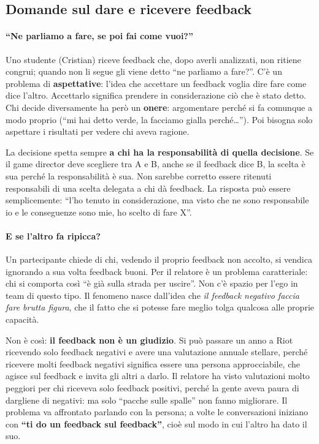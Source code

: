 \subsection{Domande sul dare e ricevere feedback}

\paragraph{``Ne parliamo a fare, se poi fai come vuoi?''} Uno studente (Cristian)
riceve feedback che, dopo averli analizzati, non ritiene congrui; quando non
li segue gli viene detto ``ne parliamo a fare?''. C'è un problema di
\textbf{aspettative}: l'idea che accettare un feedback voglia dire fare come
dice l'altro. Accettarlo significa prendere in considerazione ciò che è stato
detto. Chi decide diversamente ha però un \textbf{onere}: argomentare perché
si fa comunque a modo proprio (``mi hai detto verde, la facciamo gialla
perché\dots''). Poi bisogna solo aspettare i risultati per vedere chi aveva
ragione.

La decisione spetta sempre \textbf{a chi ha la responsabilità di quella
decisione}. Se il game director deve scegliere tra A e B, anche se il
feedback dice B, la scelta è sua perché la responsabilità è sua. Non sarebbe
corretto essere ritenuti responsabili di una scelta delegata a chi dà
feedback. La risposta può essere semplicemente: ``l'ho tenuto in
considerazione, ma visto che ne sono responsabile io e le conseguenze sono
mie, ho scelto di fare X''.

\paragraph{E se l'altro fa ripicca?} Un partecipante chiede di chi, vedendo
il proprio feedback non accolto, si vendica ignorando a sua volta feedback
buoni. Per il relatore è un problema caratteriale: chi si comporta così ``è
già sulla strada per uscire''. Non c'è spazio per l'ego in team di questo
tipo. Il fenomeno nasce dall'idea che \emph{il feedback negativo faccia fare
brutta figura}, che il fatto che si potesse fare meglio tolga qualcosa alle
proprie capacità.

Non è così: \textbf{il feedback non è un giudizio}. Si può passare un anno a
Riot ricevendo solo feedback negativi e avere una valutazione annuale
stellare, perché ricevere molti feedback negativi significa essere una persona
approcciabile, che agisce sul feedback e invita gli altri a darlo. Il relatore
ha visto valutazioni molto peggiori per chi riceveva solo feedback positivi,
perché la gente aveva paura di dargliene di negativi: ma solo ``pacche sulle
spalle'' non fanno migliorare. Il problema va affrontato parlando con la
persona; a volte le conversazioni iniziano con \textbf{``ti do un feedback sul
feedback''}, cioè sul modo in cui l'altro ha dato il suo.

